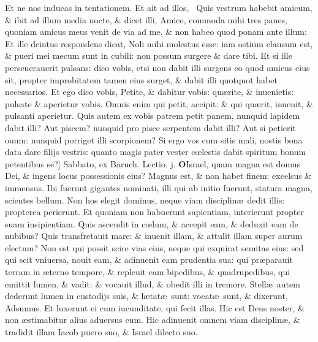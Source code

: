 \documentclass[a5paper,10pt]{book}
\def\leftmarginnote{%
	\lrmarginnote{\hskip -\marginparsep \hskip -6.5em}}
\def\rightmarginnote{%
	\lrmarginnote{\hskip\columnwidth \hskip -1em}}
\def\ae{æ}
\def\oe{œ}
\begin{document}
\begin{multicols*}{2}
Et ne nos inducas in tentationem.
Et ait ad illos, \textdagger \ Quis\rightmarginnote{B} vestrum habebit amicum, \& ibit ad illum media nocte, \& dicet illi, Amice, commoda mihi tres panes, quoniam amicus meus venit de via ad me, \& non habeo quod ponam ante illum: Et ille deintus respondens dicat, Noli mihi molestus esse: iam ostium clausum est, \& pueri mei mecum sunt in cubili: non possum surgere \& dare tibi.
Et si ille perseuerauerit pulsans: dico vobis, etsi non dabit illi surgens eo quod amicus eius sit, propter improbitatem tamen eius surget, \& dabit illi quotquot habet necessarios.
Et ego dico vobis, Petite, \& dabitur vobis: qu\ae rite, \& inuenietis: pulsate \& aperietur vobis. Omnis enim qui petit, accipit: \& qui qu\ae rit, inuenit, \& pulsanti aperietur.
Quis autem ex vobis patrem petit panem, nunquid lapidem dabit illi?
Aut piscem? nunquid pro pisce serpentem dabit illi? Aut si petierit ouum: nunquid porriget illi scorpionem?
Si ergo vos cum sitis mali, nostis bona data dare filijs vestris: quanto magis pater vester c\oe lestis dabit spiritum bonum petentibus se?]
\newline {} \color{red} \hypertarget{SAT-QVARTA-ADV}{Sabbato,} ex Baruch. \hfill Lectio. j. \color{black}%
\vspace{-.25em}
\lettrine[lines=2]{\bfseries O}{}Israel, quam\leftmarginnote{\begin{flushright}ca. 3.\end{flushright}} magna est domus Dei, \& ingens locus possessionis eius?
Magnus est, \& non habet finem: excelsus \& immensus.
Ibi fuerunt gigantes nominati, illi qui ab initio fuerunt, statura magna, scientes bellum.
Non hos elegit dominus, neque viam disciplin\ae \ dedit illis:
propterea perierunt.
Et quoniam non habuerunt sapientiam, interierunt propter suam insipientiam.
Quis ascendit in c\oe lum, \& accepit eam, \& deduxit eam de nubibus? Quis transfretauit mare: \& inuenit illam, \& attulit illam super aurum electum?
Non est qui possit scire vias eius, neque qui exquirat semitas eius: sed qui scit vniuersa, nouit eam, \& adinuenit eam prudentia sua: qui pr\ae parauit terram in \ae terno tempore, \& repleuit eam bipedibus, \& quadrupedibus, qui emittit lumen, \& vadit: \& vocauit illud, \& obedit illi in tremore.
Stell\ae \ autem dederunt lumen in custodijs suis, \& l\ae tat\ae \ sunt: vocat\ae \ sunt, \& dixerunt, Adsumus.
Et luxerunt ei cum iucunditate, qui fecit illas.
Hic est Deus noster, \& non \ae stimabitur alius aduersus eum.
Hic adinuenit omnem viam disciplin\ae , \& tradidit illam Iacob puero suo, \& Israel dilecto suo.

\end{multicols*}
\end{document}
